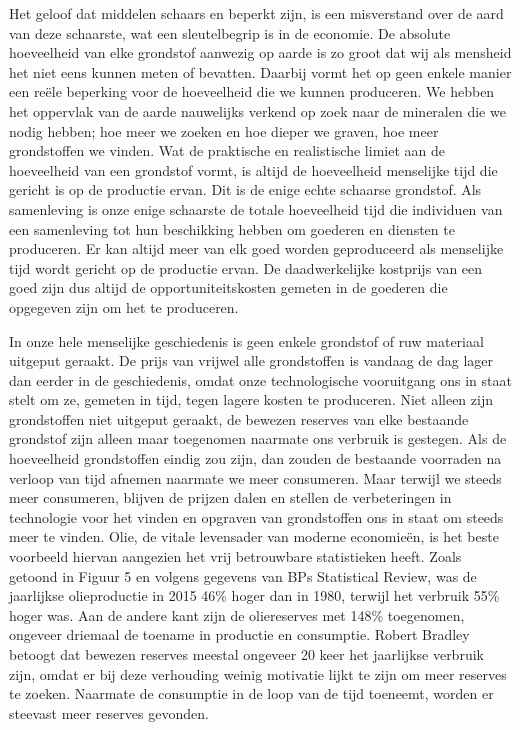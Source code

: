 Het geloof dat middelen schaars en beperkt zijn, is een misverstand over de aard van deze schaarste, wat een sleutelbegrip is in de economie. De absolute hoeveelheid van elke grondstof aanwezig op aarde is zo groot dat wij als mensheid het niet eens kunnen meten of bevatten. Daarbij vormt het op geen enkele manier een reële beperking voor de hoeveelheid die we kunnen produceren. We hebben het oppervlak van de aarde nauwelijks verkend op zoek naar de mineralen die we nodig hebben; hoe meer we zoeken en hoe dieper we graven, hoe meer grondstoffen we vinden. Wat de praktische en realistische limiet aan de hoeveelheid van een grondstof vormt, is altijd de hoeveelheid menselijke tijd die gericht is op de productie ervan. Dit is de enige echte schaarse grondstof. Als samenleving is onze enige schaarste de totale hoeveelheid tijd die individuen van een samenleving tot hun beschikking hebben om goederen en diensten te produceren. Er kan altijd meer van elk goed worden geproduceerd als menselijke tijd wordt gericht op de productie ervan. De daadwerkelijke kostprijs van een goed zijn dus altijd de opportuniteitskosten gemeten in de goederen die opgegeven zijn om het te produceren.

In onze hele menselijke geschiedenis is geen enkele grondstof of ruw materiaal uitgeput geraakt. De prijs van vrijwel alle grondstoffen is vandaag de dag lager dan eerder in de geschiedenis, omdat onze technologische vooruitgang ons in staat stelt om ze, gemeten in tijd, tegen lagere kosten te produceren. Niet alleen zijn grondstoffen niet uitgeput geraakt, de bewezen reserves van elke bestaande grondstof zijn alleen maar toegenomen naarmate ons verbruik is gestegen. Als de hoeveelheid grondstoffen eindig zou zijn, dan zouden de bestaande voorraden na verloop van tijd afnemen naarmate we meer consumeren. Maar terwijl we steeds meer consumeren, blijven de prijzen dalen en stellen de verbeteringen in technologie voor het vinden en opgraven van grondstoffen ons in staat om steeds meer te vinden. Olie, de vitale levensader van moderne economieën, is het beste voorbeeld hiervan aangezien het vrij betrouwbare statistieken heeft. Zoals getoond in Figuur 5 en volgens gegevens van BP\textquotesingle s Statistical Review, was de jaarlijkse olieproductie in 2015 46\% hoger dan in 1980, terwijl het verbruik 55\% hoger was. Aan de andere kant zijn de oliereserves met 148\% toegenomen, ongeveer driemaal de toename in productie en consumptie. Robert Bradley betoogt dat bewezen reserves meestal ongeveer 20 keer het jaarlijkse verbruik zijn, omdat er bij deze verhouding weinig motivatie lijkt te zijn om meer reserves te zoeken.\autocite{95} Naarmate de consumptie in de loop van de tijd toeneemt, worden er steevast meer reserves gevonden.

